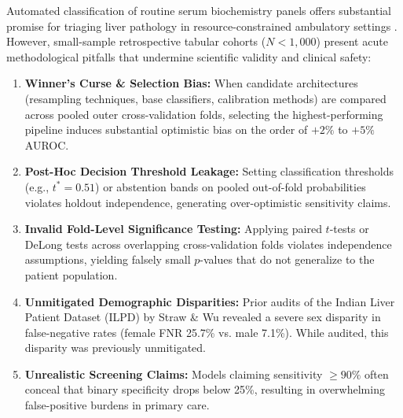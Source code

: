 \documentclass[11pt,a4paper]{article}
\begin{document}
Automated classification of routine serum biochemistry panels offers substantial promise for triaging liver pathology in resource-constrained ambulatory settings \cite{ramana2012critical}. However, small-sample retrospective tabular cohorts ($N < 1,000$) present acute methodological pitfalls that undermine scientific validity and clinical safety:
\begin{enumerate}
    \item \textbf{Winner's Curse \& Selection Bias:} When candidate architectures (resampling techniques, base classifiers, calibration methods) are compared across pooled outer cross-validation folds, selecting the highest-performing pipeline induces substantial optimistic bias on the order of $+2\%$ to $+5\%$ AUROC.
    \item \textbf{Post-Hoc Decision Threshold Leakage:} Setting classification thresholds (e.g., $t^* = 0.51$) or abstention bands on pooled out-of-fold probabilities violates holdout independence, generating over-optimistic sensitivity claims.
    \item \textbf{Invalid Fold-Level Significance Testing:} Applying paired $t$-tests or DeLong tests across overlapping cross-validation folds violates independence assumptions, yielding falsely small $p$-values that do not generalize to the patient population.
    \item \textbf{Unmitigated Demographic Disparities:} Prior audits of the Indian Liver Patient Dataset (ILPD) by Straw \& Wu \cite{straw2022investigating} revealed a severe sex disparity in false-negative rates (female FNR 25.7\% vs. male 7.1\%). While audited, this disparity was previously unmitigated.
    \item \textbf{Unrealistic Screening Claims:} Models claiming sensitivity $\ge 90\%$ often conceal that binary specificity drops below 25\%, resulting in overwhelming false-positive burdens in primary care.
\end{enumerate}
\end{document}
